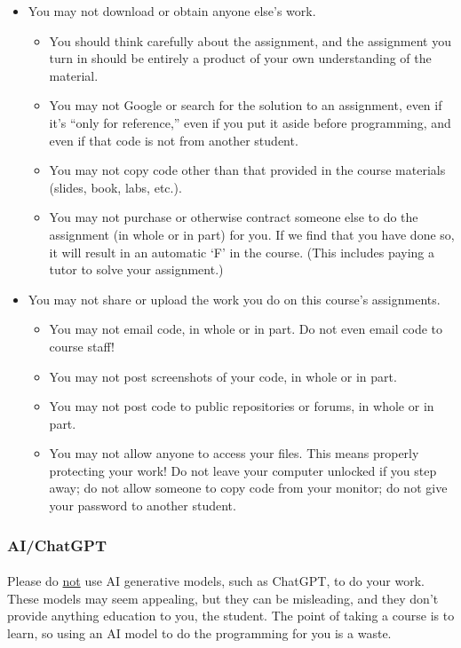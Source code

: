 \documentclass[letter,11pt]{article}
\begin{document}
\begin{itemize}
\item You may not download or obtain anyone else’s work.
\begin{itemize}
\item You should think carefully about the assignment, and the assignment you turn in should be entirely a product of your own understanding of the material.
\item You may not Google or search for the solution to an assignment, even if it’s ``only for reference,'' even if you put it aside before programming, and even if that code is not from another student.
\item You may not copy code other than that provided in the course materials (slides, book, labs, etc.).
\item You may not purchase or otherwise contract someone else to do the assignment (in whole or in part) for you. If we find that you have done so, it will result in an automatic `F' in the course. (This includes paying a tutor to solve your assignment.)
\end{itemize}
\item You may not share or upload the work you do on this course’s assignments.
\begin{itemize}
\item You may not email code, in whole or in part. Do not even email code to course staff!
\item You may not post screenshots of your code, in whole or in part.
\item You may not post code to public repositories or forums, in whole or in part.
\item You may not allow anyone to access your files. This means properly protecting your work! Do not leave your computer unlocked if you step away; do not allow someone to copy code from your monitor; do not give your password to another student.
\end{itemize}
\end{itemize}

\subsubsection*{AI/ChatGPT}
\paragraph{}Please do \underline{not} use AI generative models, such as ChatGPT, to do your work. These models may seem appealing, but they can be misleading, and they don't provide anything education to you, the student. The point of taking a course is to learn, so using an AI model to do the programming for you is a waste.
\end{document}
